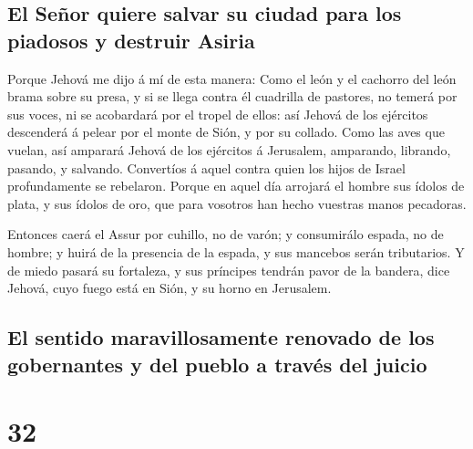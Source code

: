 \hypertarget{el-seuxf1or-quiere-salvar-su-ciudad-para-los-piadosos-y-destruir-asiria}{%
\subsection{El Señor quiere salvar su ciudad para los piadosos y
destruir
Asiria}\label{el-seuxf1or-quiere-salvar-su-ciudad-para-los-piadosos-y-destruir-asiria}}

 Porque Jehová me dijo á mí de esta manera: Como el león y
el cachorro del león brama sobre su presa, y si se llega contra él
cuadrilla de pastores, no temerá por sus voces, ni se acobardará por el
tropel de ellos: así Jehová de los ejércitos descenderá á pelear por el
monte de Sión, y por su collado.  Como las aves que
vuelan, así amparará Jehová de los ejércitos á Jerusalem, amparando,
librando, pasando, y salvando.  Convertíos á aquel contra
quien los hijos de Israel profundamente se rebelaron. 
Porque en aquel día arrojará el hombre sus ídolos de plata, y sus ídolos
de oro, que para vosotros han hecho vuestras manos pecadoras.

 Entonces caerá el Assur por cuhillo, no de varón; y
consumirálo espada, no de hombre; y huirá de la presencia de la espada,
y sus mancebos serán tributarios.  Y de miedo pasará su
fortaleza, y sus príncipes tendrán pavor de la bandera, dice Jehová,
cuyo fuego está en Sión, y su horno en Jerusalem.

\hypertarget{el-sentido-maravillosamente-renovado-de-los-gobernantes-y-del-pueblo-a-travuxe9s-del-juicio}{%
\subsection{El sentido maravillosamente renovado de los gobernantes y
del pueblo a través del
juicio}\label{el-sentido-maravillosamente-renovado-de-los-gobernantes-y-del-pueblo-a-travuxe9s-del-juicio}}

\hypertarget{section-31}{%
\section{32}\label{section-31}}

